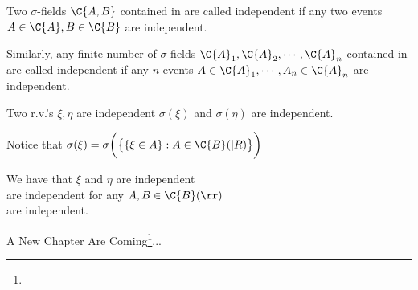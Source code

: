 \begin{definition}
    Two $\sigma$-fields $\C{A, B}$ contained in  are called independent if
    any two events $A \in \C{A}, B \in \C{B}$ are independent.

    Similarly, any finite number of $\sigma$-fields $\C{A}_1, \C{A}_2, \cdots, \C{A}_n$ contained in 
     are called independent if any $n$ events $A\in \C{A}_1, \cdots, A_n\in \C{A}_n$ are independent.
\end{definition}

 Two r.v.'s  $\xi, \eta$ are independent \equ $\sigma(\xi)$ and $\sigma(\eta)$ are independent. 

 Notice that $\sigma(\xi) = \sigma\biggl(\bigl\{\{\xi \in A\}: A\in \C{B}(|R)\bigr\}\biggr)$

 We have that $\xi$ and $\eta$ are independent\\
 \equ {} are independent for any $A, B \in \C{B}(\rr)$\\
 \equ {} are independent.

\vspace*{3em}
A New Chapter Are Coming\footnote[1]{\fuzhu}...

